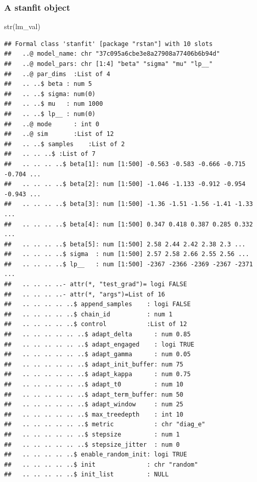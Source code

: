 \documentclass[
  11pt,
]{article}
\newenvironment{Shaded}{\begin{snugshade}}{\end{snugshade}}
\newcommand{\FunctionTok}[1]{\textcolor[rgb]{0.00,0.00,0.00}{#1}}
\newcommand{\NormalTok}[1]{#1}
\begin{document}
\hypertarget{a-stanfit-object}{%
\subsubsection{A stanfit object}\label{a-stanfit-object}}

\begin{Shaded}
\begin{Highlighting}[]
\FunctionTok{str}\NormalTok{(lm\_val)}
\end{Highlighting}
\end{Shaded}

\begin{verbatim}
## Formal class 'stanfit' [package "rstan"] with 10 slots
##   ..@ model_name: chr "37c095a6cbe3e8a27908a77406b6b94d"
##   ..@ model_pars: chr [1:4] "beta" "sigma" "mu" "lp__"
##   ..@ par_dims  :List of 4
##   .. ..$ beta : num 5
##   .. ..$ sigma: num(0) 
##   .. ..$ mu   : num 1000
##   .. ..$ lp__ : num(0) 
##   ..@ mode      : int 0
##   ..@ sim       :List of 12
##   .. ..$ samples    :List of 2
##   .. .. ..$ :List of 7
##   .. .. .. ..$ beta[1]: num [1:500] -0.563 -0.583 -0.666 -0.715 -0.704 ...
##   .. .. .. ..$ beta[2]: num [1:500] -1.046 -1.133 -0.912 -0.954 -0.943 ...
##   .. .. .. ..$ beta[3]: num [1:500] -1.36 -1.51 -1.56 -1.41 -1.33 ...
##   .. .. .. ..$ beta[4]: num [1:500] 0.347 0.418 0.387 0.285 0.332 ...
##   .. .. .. ..$ beta[5]: num [1:500] 2.58 2.44 2.42 2.38 2.3 ...
##   .. .. .. ..$ sigma  : num [1:500] 2.57 2.58 2.66 2.55 2.56 ...
##   .. .. .. ..$ lp__   : num [1:500] -2367 -2366 -2369 -2367 -2371 ...
##   .. .. .. ..- attr(*, "test_grad")= logi FALSE
##   .. .. .. ..- attr(*, "args")=List of 16
##   .. .. .. .. ..$ append_samples    : logi FALSE
##   .. .. .. .. ..$ chain_id          : num 1
##   .. .. .. .. ..$ control           :List of 12
##   .. .. .. .. .. ..$ adapt_delta      : num 0.85
##   .. .. .. .. .. ..$ adapt_engaged    : logi TRUE
##   .. .. .. .. .. ..$ adapt_gamma      : num 0.05
##   .. .. .. .. .. ..$ adapt_init_buffer: num 75
##   .. .. .. .. .. ..$ adapt_kappa      : num 0.75
##   .. .. .. .. .. ..$ adapt_t0         : num 10
##   .. .. .. .. .. ..$ adapt_term_buffer: num 50
##   .. .. .. .. .. ..$ adapt_window     : num 25
##   .. .. .. .. .. ..$ max_treedepth    : int 10
##   .. .. .. .. .. ..$ metric           : chr "diag_e"
##   .. .. .. .. .. ..$ stepsize         : num 1
##   .. .. .. .. .. ..$ stepsize_jitter  : num 0
##   .. .. .. .. ..$ enable_random_init: logi TRUE
##   .. .. .. .. ..$ init              : chr "random"
##   .. .. .. .. ..$ init_list         : NULL

\end{verbatim}
\end{document}
